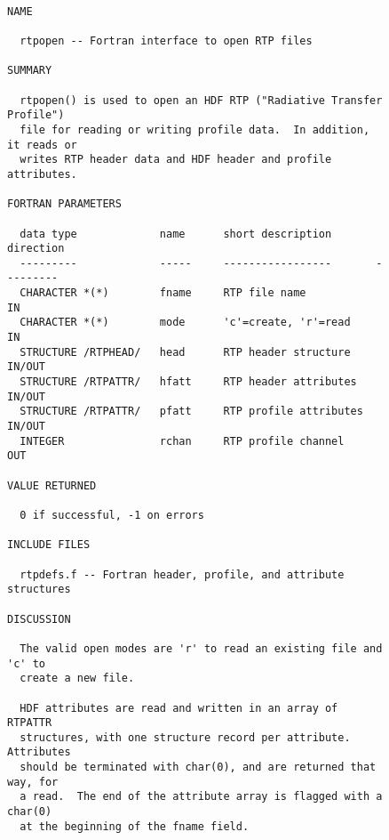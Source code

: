 \documentclass[12pt]{article}
\begin{document}
\begin{figure}
{\small
\begin{verbatim}

NAME

  rtpopen -- Fortran interface to open RTP files

SUMMARY

  rtpopen() is used to open an HDF RTP ("Radiative Transfer Profile")
  file for reading or writing profile data.  In addition, it reads or
  writes RTP header data and HDF header and profile attributes. 

FORTRAN PARAMETERS

  data type             name      short description       direction
  ---------             -----     -----------------       ---------
  CHARACTER *(*)        fname     RTP file name              IN
  CHARACTER *(*)        mode      'c'=create, 'r'=read       IN
  STRUCTURE /RTPHEAD/   head      RTP header structure       IN/OUT
  STRUCTURE /RTPATTR/   hfatt     RTP header attributes      IN/OUT
  STRUCTURE /RTPATTR/   pfatt     RTP profile attributes     IN/OUT
  INTEGER               rchan     RTP profile channel        OUT

VALUE RETURNED

  0 if successful, -1 on errors

INCLUDE FILES

  rtpdefs.f -- Fortran header, profile, and attribute structures

DISCUSSION

  The valid open modes are 'r' to read an existing file and 'c' to
  create a new file.

  HDF attributes are read and written in an array of RTPATTR
  structures, with one structure record per attribute.  Attributes
  should be terminated with char(0), and are returned that way, for
  a read.  The end of the attribute array is flagged with a char(0)
  at the beginning of the fname field.

\end{verbatim}
}
\end{figure}
\end{document}

